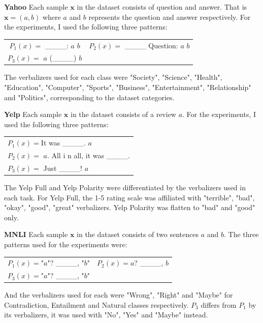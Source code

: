 \documentclass[11pt,a4paper]{article}
\begin{document}
\vspace{8pt}
\noindent \textbf{Yahoo} \quad
Each sample $\textbf{x}$ in the dataset consists of question and answer.
That is $\textbf{x}=(a, b)$ where $a$ and $b$ represents the question and answer respectively.
For the experiments, I used the following three patterns:
\begin{table}[H]
	\renewcommand{\arraystretch}{1.5}
	\begin{tabularx}{\textwidth}{cc}
		$P_1(x)=$ \_\_\_\_: $a$ $b$ & $P_2(x)=$ \_\_\_\_ Question: $a$ $b$ \\
		$P_3(x)=$ $a$ (\_\_\_\_) $b$ &  \\
	\end{tabularx}
\end{table}
The verbalizers used for each class were "Society", "Science", "Health", "Education", "Computer", "Sports", "Business", "Entertainment", "Relationship" and "Politics", corresponding to the dataset categories.

\vspace{8pt}
\noindent \textbf{Yelp} \quad
Each sample $\textbf{x}$ in the dataset consists of a review $a$.
For the experiments, I used the following three patterns:
\begin{table}[H]
	\renewcommand{\arraystretch}{1.5}
	\begin{tabularx}{\textwidth}{l}
		$P_1(x)=$It was \_\_\_\_. $a$ \\
		$P_2(x)=$ $a$. All i n all, it was \_\_\_\_. \\
		$P_3(x)=$ Just \_\_\_\_! $a$  \\
	\end{tabularx}
\end{table}
The Yelp Full and Yelp Polarity were differentiated by the verbalizers used in each task.
For Yelp Full, the 1-5 rating scale was affiliated with "terrible", "bad", "okay", "good", "great" verbalizers.
Yelp Polarity was flatten to "bad" and "good" only.

\vspace{8pt}
\noindent \textbf{MNLI} \quad
Each sample $\textbf{x}$ in the dataset consists of two sentences $a$ and $b$.
The three patterns used for the experiments were:
\begin{table}[H]
	\renewcommand{\arraystretch}{1.5}
	\begin{tabularx}{\textwidth}{cc}
		$P_1(x)=$"$a$"? \_\_\_\_, "$b$" & $P_2(x)=$$a$? \_\_\_\_, $b$ \\
		$P_3(x)=$"$a$"? \_\_\_\_, "$b$" & \\
	\end{tabularx}
\end{table}
And the verbalizers used for each were "Wrong", "Right" and "Maybe" for Contradiction, Entailment and Natural classes respectively.
$P_3$ differs from $P_1$ by its verbalizers, it was used with "No", "Yes" and "Maybe" instead.
\end{document}
